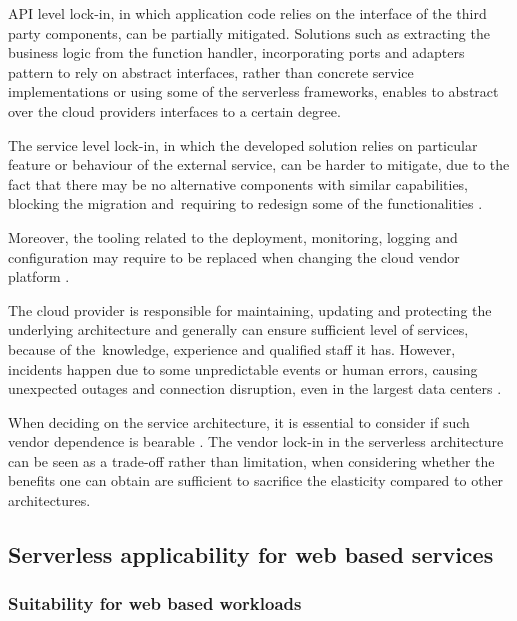 API level lock-in, in which application code relies on the interface of the third party components, can be partially mitigated.
Solutions such as extracting the business logic from the function handler, incorporating ports and adapters pattern to rely on abstract interfaces, rather than concrete service implementations or using some of the serverless frameworks, enables to abstract over the cloud providers interfaces to a certain degree.

The service level lock-in, in which the developed solution relies on particular feature or behaviour of the external service, can be harder to mitigate, due to the fact that there may be no alternative components with similar capabilities, blocking the migration and~requiring to redesign some of the functionalities \cite{EvaluationOfServerlessApplicationProgrammingModel}.

Moreover, the tooling related to the deployment, monitoring, logging and configuration may require to be replaced when changing the cloud vendor platform \cite{MartinFowlerServerless}.

The cloud provider is responsible for maintaining, updating and protecting the underlying architecture and generally can ensure sufficient level of services, because of the~knowledge, experience and qualified staff it has. However, incidents happen due to some unpredictable events or human errors, causing unexpected outages and connection disruption, even in the largest data centers \cite{EvaluationOfServerlessApplicationProgrammingModel}.

When deciding on the service architecture, it is essential to consider if such vendor dependence is bearable \cite{LeveragingServerlessCloudComputingArchitectures}.
The vendor lock-in in the serverless architecture can be seen as a trade-off rather than limitation, when considering whether the benefits one can obtain are sufficient to sacrifice the elasticity compared to other architectures.

\subsection{Serverless applicability for web based services}

\subsubsection{Suitability for web based workloads} \label{chapter:serverless-suitability-for-web-based-workloads}

